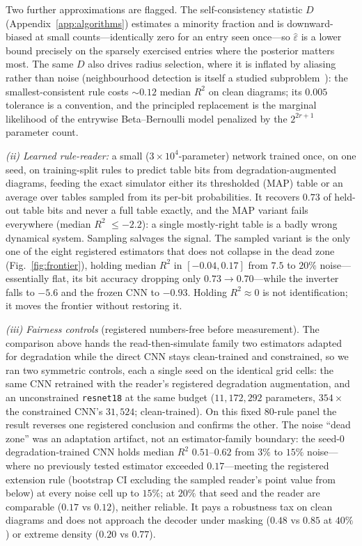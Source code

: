 \documentclass[aip,cha,amsmath,amssymb,reprint,floatfix]{revtex4-2}
\newcommand{\rtwo}{$R^2$}
\begin{document}
Two further
approximations are flagged. The self-consistency statistic $D$
(Appendix~\ref{app:algorithms}) estimates a minority fraction and is
downward-biased at small counts---identically zero for an entry seen once---so
$\hat\varepsilon$ is a lower bound precisely on the sparsely exercised
entries where the posterior matters most. The same $D$ also drives radius
selection, where it is inflated by aliasing rather than noise (neighbourhood
detection is itself a studied subproblem~\cite{yangbillings2000}): the
smallest-consistent rule costs ${\sim}0.12$ median \rtwo{} on clean
diagrams; its $0.005$ tolerance is a convention, and the principled
replacement is the marginal likelihood of the entrywise Beta--Bernoulli model
penalized by the $2^{2r+1}$ parameter count.

\emph{(ii) Learned rule-reader:} a small ($3\times10^4$-parameter) network
trained once, on one seed, on training-split rules to predict table bits from
degradation-augmented diagrams, feeding the exact simulator either its
thresholded (MAP) table or an average over tables sampled from its per-bit
probabilities. It recovers $0.73$ of held-out table bits and never a full
table exactly, and the MAP variant fails everywhere (median \rtwo{}
$\le-2.2$): a single mostly-right table is a badly wrong dynamical system.
Sampling salvages the signal. The sampled variant is the only one of the eight
registered estimators that does not collapse in the dead zone
(Fig.~\ref{fig:frontier}), holding median \rtwo{} in $[-0.04,0.17]$ from
$7.5$ to $20\%$ noise---essentially flat, its bit accuracy dropping only
$0.73{\to}0.70$---while the inverter falls to $-5.6$ and the frozen CNN to
$-0.93$. Holding \rtwo{}${\approx}0$ is not identification; it moves the
frontier without restoring it.

\emph{(iii) Fairness controls} (registered numbers-free before measurement).
The comparison above hands the read-then-simulate family two estimators
adapted for degradation while the direct CNN stays clean-trained and
constrained, so we ran two symmetric controls, each a single seed on the
identical grid cells: the same CNN retrained with the reader's registered
degradation augmentation, and an unconstrained \texttt{resnet18} at the same
budget ($11{,}172{,}292$ parameters, $354\times$ the constrained CNN's
$31{,}524$; clean-trained). On this fixed $80$-rule panel the result reverses one registered
conclusion and confirms the other. The noise ``dead zone'' was an
adaptation artifact, not an estimator-family boundary: the seed-0
degradation-trained CNN holds median \rtwo{} $0.51$--$0.62$ from $3\%$
to $15\%$ noise---where no previously tested estimator exceeded
$0.17$---meeting the registered extension rule (bootstrap CI excluding the
sampled reader's point value from below) at every noise cell up to $15\%$;
at $20\%$ that seed and the reader are comparable ($0.17$ vs $0.12$),
neither reliable. It pays a robustness tax on clean diagrams
and does not approach the decoder under masking ($0.48$ vs $0.85$ at
$40\%$) or extreme density ($0.20$ vs $0.77$).
\end{document}
